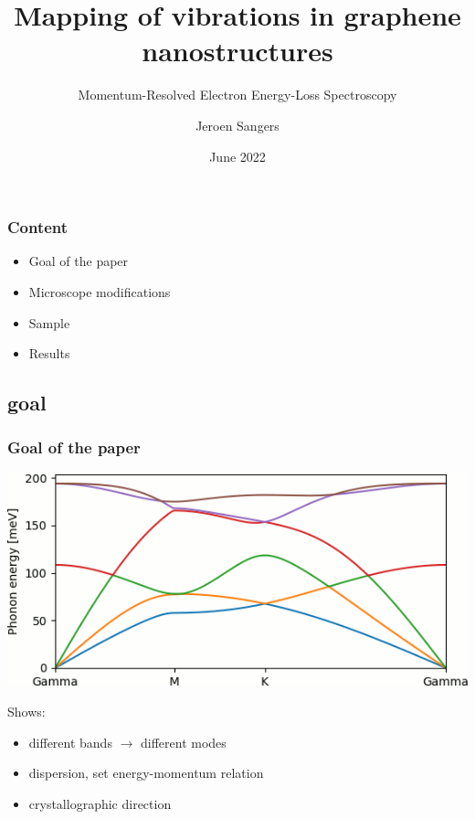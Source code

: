 \documentclass{beamer}
\subtitle{Momentum-Resolved Electron Energy-Loss Spectroscopy}
\title{Mapping of vibrations in graphene nanostructures}
\institute{AP3252 - Electron Microscopy - TU Delft}
\author{Jeroen Sangers}
\date{June 2022}
\begin{document}
\begin{frame}
	\titlepage
\end{frame}


\begin{frame}
	\frametitle{Content}
	\begin{itemize}
		\item Goal of the paper
  		\item Microscope modifications
    	\item Sample
     	\item Results
	\end{itemize}
\end{frame}

\begin{frame}
	\section{goal}
	\frametitle{Goal of the paper}
	\begin{minipage}{1\linewidth}
		\centering
		\includegraphics[width=.75\linewidth, keepaspectratio]{Figures/PhononDispersionGraphene.png}
	\end{minipage}%
	\hfill
	\begin{minipage}{1\linewidth}
		Shows:
		\begin{itemize}
			\item different bands $\rightarrow$ different modes
   			\item dispersion, set energy-momentum relation
      		\item crystallographic direction
		\end{itemize}
	\end{minipage}

\end{frame}
\end{document}
